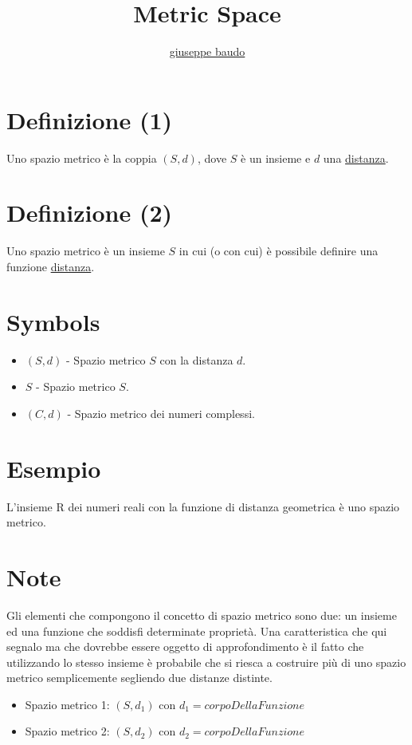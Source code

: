 \documentclass[a4paper,10pt]{article}
\title{Metric Space}
\author{\href{http://www.baudo.hol.es}{giuseppe baudo}}
\begin{document}
\maketitle

\section{Definizione (1)}
Uno spazio metrico è la coppia $(S, d)$, dove $S$ è un insieme e $d$ una \href{Distanza.html}{distanza}.

\section{Definizione (2)}
Uno spazio metrico è un insieme $S$ in cui (o con cui) è possibile definire una funzione \href{Distanza.html}{distanza}.

\section{Symbols}
\begin{itemize}
 \item $(S, d)$ - Spazio metrico $S$ con la distanza $d$. 
 \item $S$ - Spazio metrico $S$. 
 \item $(C, d)$ - Spazio metrico dei numeri complessi.
\end{itemize}

\section{Esempio}
L'insieme R dei numeri reali con la funzione di distanza geometrica è uno spazio metrico.

\section{Note}
Gli elementi che compongono il concetto di spazio metrico sono due: un insieme ed una funzione che soddisfi determinate proprietà. Una caratteristica che qui segnalo ma che dovrebbe essere oggetto di approfondimento
è il fatto che utilizzando lo stesso insieme è probabile che si riesca a costruire più di uno spazio metrico semplicemente segliendo due distanze distinte.

\begin{itemize}
 \item Spazio metrico 1: $(S, d_1)$ con $d_1=corpoDellaFunzione$
 \item Spazio metrico 2: $(S, d_2)$ con $d_2=corpoDellaFunzione$
\end{itemize}
\end{document}
